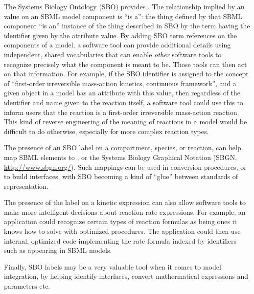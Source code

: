 The Systems Biology Ontology (SBO) provides . The relationship implied by an  value on an SBML model component is ``is a'': the
thing defined by that SBML component ``is an'' instance of the
thing described in SBO by the term having the identifier given by the  attribute value. By adding SBO term
references on the components of a model, a software tool can
provide additional details using independent, shared vocabularies
that can enable \emph{other} software tools to recognize precisely
what the component is meant to be.  Those tools can then act on
that information.  For example, if the SBO identifier
 is assigned to the concept of ``first-order
irreversible mass-action kinetics, continuous framework'', and a
given \KineticLaw object in a model has an 
attribute with this value, then regardless of the
identifier and name given to the reaction itself, a software tool
could use this to inform users that the reaction is a first-order
irreversible mass-action reaction.  This kind of reverse
engineering of the meaning of reactions in a model would be
difficult to do otherwise, especially for more complex reaction
types.

The presence of an SBO label on a compartment, species, or
reaction, can help map SBML elements to , or the Systems Biology Graphical
Notation (SBGN, \url{http://www.sbgn.org/}).  Such mappings can be
used in conversion procedures, or to build interfaces, with SBO
becoming a kind of ``glue'' between standards of representation.

The presence of the label on a kinetic expression can also allow
software tools to make more intelligent decisions about reaction
rate expressions.  For example, an application could recognize
certain types of reaction formulas as being ones it
knows how to solve with optimized procedures.  The application
could then use internal, optimized code implementing the rate
formula indexed by identifiers such as 
appearing in SBML models.

Finally, SBO labels may be a very valuable tool when it comes to model integration, by helping identify interfaces, convert mathermatical expressions and parameters etc. 


